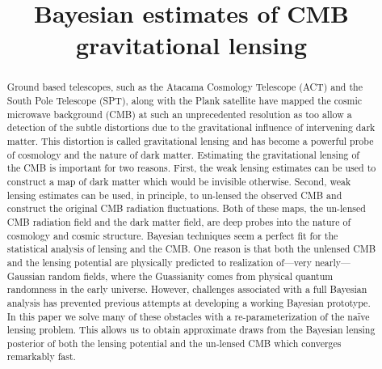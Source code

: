 \documentclass[noinfoline]{imsart}
\begin{document}
\begin{frontmatter}
\title{Bayesian estimates of CMB gravitational lensing}

\begin{abstract} 
Ground based telescopes, such as the Atacama Cosmology Telescope (ACT)  and  the South Pole Telescope (SPT), along with the Plank satellite have mapped the  cosmic microwave background (CMB) at such an unprecedented resolution as too allow a detection of the subtle distortions  due to the gravitational influence of intervening  dark matter. This distortion is called  gravitational lensing and has become a  powerful probe of cosmology and the nature of dark matter.
Estimating the gravitational lensing of the CMB  is important for two reasons. First, the weak lensing estimates can be used to construct a map of dark matter which would be invisible otherwise.
Second,  weak lensing estimates can be used, in principle, to un-lensed the observed CMB and construct the original CMB radiation fluctuations. Both of these maps,  the un-lensed CMB radiation field and the dark matter field, are deep probes into the nature of cosmology and cosmic structure. Bayesian techniques seem a perfect fit for the statistical analysis of lensing and the CMB. One reason is that both the unlensed CMB and the lensing potential are physically predicted to realization of---very nearly---Gaussian random fields, where the Guassianity comes from physical quantum randomness in the early universe. However, challenges associated with a full Bayesian analysis has prevented previous attempts at  developing a working Bayesian prototype. 
In this paper we solve many of these obstacles with a re-parameterization of the na\"ive lensing problem. This  allows us to obtain approximate draws from the  Bayesian lensing posterior of both the lensing potential and the un-lensed CMB which converges remarkably fast. 
\end{abstract}

\begin{keyword}
\end{keyword}

\end{frontmatter}
\end{document}
